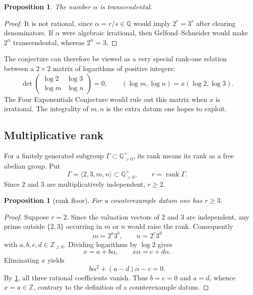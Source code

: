 \documentclass[11pt,oneside]{article}
\newtheorem{proposition}[theorem]{Proposition}
\theoremstyle{definition}
\theoremstyle{remark}
\newcommand{\Q}{\mathbb{Q}}
\newcommand{\Z}{\mathbb{Z}}
\newcommand{\rank}{\operatorname{rank}}
\begin{document}
\begin{proposition}\label{prop:alpha-transcendental}
The number $\alpha$ is transcendental.
\end{proposition}

\begin{proof}
It is not rational, since $\alpha=r/s\in\Q$ would imply $2^r=3^s$ after
clearing denominators.  If $\alpha$ were algebraic irrational, then
Gelfond--Schneider would make $2^\alpha$ transcendental, whereas
$2^\alpha=3$.
\end{proof}

The conjecture can therefore be viewed as a very special rank-one relation
between a $2\times2$ matrix of logarithms of positive integers:
\begin{equation}\label{eq:logdet}
 \det\begin{pmatrix}
  \log2&\log3\\
  \log m&\log n
 \end{pmatrix}=0,
 \qquad
 (\log m,\log n)=x(\log2,\log3).
\end{equation}
The Four Exponentials Conjecture would rule out this matrix when $x$ is
irrational.  The integrality of $m,n$ is the extra datum one hopes to exploit.

\subsection{Multiplicative rank}

For a finitely generated subgroup $\Gamma\subset\Q_{>0}^{\times}$, its rank
means its rank as a free abelian group.  Put
\[
 \Gamma=\langle2,3,m,n\rangle\subset\Q_{>0}^{\times},\qquad r=\rank\Gamma.
\]
Since $2$ and $3$ are multiplicatively independent, $r\ge2$.

\begin{proposition}[rank floor]\label{prop:rank-floor}
For a counterexample datum one has $r\ge3$.
\end{proposition}

\begin{proof}
Suppose $r=2$.  Since the valuation vectors of $2$ and $3$ are independent,
any prime outside $\{2,3\}$ occurring in $m$ or $n$ would raise the rank.
Consequently
\[
 m=2^a3^b,\qquad n=2^c3^d
\]
with $a,b,c,d\in\Z_{\ge0}$.  Dividing logarithms by $\log2$ gives
\[
 x=a+b\alpha,\qquad x\alpha=c+d\alpha.
\]
Eliminating $x$ yields
\[
 b\alpha^2+(a-d)\alpha-c=0.
\]
By \cref{prop:alpha-transcendental}, all three rational coefficients vanish.
Thus $b=c=0$ and $a=d$, whence $x=a\in\Z$, contrary to the definition of a
counterexample datum.
\end{proof}
\end{document}
